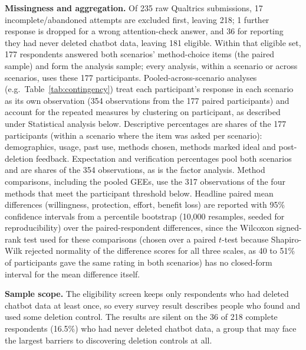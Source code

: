 \documentclass[conference,compsoc]{IEEEtran}
\begin{document}
\textbf{Missingness and aggregation.} Of 235 raw Qualtrics submissions,
17 incomplete/abandoned attempts are excluded first, leaving 218; 1
further response is dropped for a wrong attention-check answer, and 36 for reporting
they had never deleted chatbot data, leaving 181 eligible.
Within that eligible set, 177 respondents answered both scenarios'
method-choice items (the paired sample) and form the analysis sample; every
analysis, within a scenario or across scenarios, uses these 177 participants.
Pooled-across-scenario analyses (e.g.\ Table~\ref{tab:contingency}) treat
each participant's response in each scenario as its own observation (354
observations from the 177 paired participants) and account for the repeated
measures by clustering on participant, as described under Statistical
analysis below. Descriptive percentages are shares of the 177 participants (within a
scenario where the item was asked per scenario): demographics, usage, past use,
methods chosen, methods marked ideal and post-deletion feedback. Expectation
and verification percentages pool both scenarios and are shares of the 354
observations, as is the factor analysis. Method comparisons, including the pooled GEEs, use the 317
observations of the four methods that meet the participant threshold
below. Headline paired mean differences
(willingness, protection, effort, benefit loss) are reported with 95\%
confidence intervals from a percentile bootstrap (10,000 resamples,
seeded for reproducibility) over the paired-respondent differences, since
the Wilcoxon signed-rank test used for these comparisons (chosen over a
paired $t$-test because Shapiro-Wilk rejected normality of the
difference scores for all three scales, as 40 to 51\% of participants gave the
same rating in both scenarios) has no closed-form interval for the mean difference
itself.

\textbf{Sample scope.} The eligibility screen keeps only respondents who
had deleted chatbot data at least once, so every survey result describes
people who found and used some deletion control. The results are silent on
the 36 of 218 complete respondents (16.5\%) who had never deleted chatbot
data, a group that may face the largest barriers to discovering deletion
controls at all.
\end{document}
